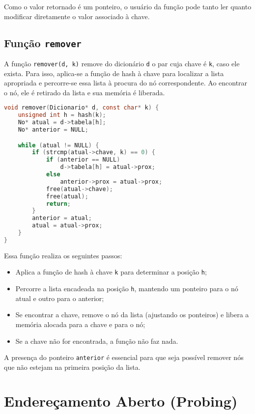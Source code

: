 Como o valor retornado é um ponteiro, o usuário da função pode tanto ler quanto modificar diretamente o valor associado à chave.

\subsection*{Função \texttt{remover}}

A função \texttt{remover(d, k)} remove do dicionário \texttt{d} o par cuja chave é \texttt{k}, caso ele exista. Para isso, aplica-se a função de hash à chave para localizar a lista apropriada e percorre-se essa lista à procura do nó correspondente. Ao encontrar o nó, ele é retirado da lista e sua memória é liberada.

\begin{lstlisting}[language=C, caption={Remoção de uma chave da tabela}]
void remover(Dicionario* d, const char* k) {
    unsigned int h = hash(k);
    No* atual = d->tabela[h];
    No* anterior = NULL;

    while (atual != NULL) {
        if (strcmp(atual->chave, k) == 0) {
            if (anterior == NULL)
                d->tabela[h] = atual->prox;
            else
                anterior->prox = atual->prox;
            free(atual->chave);
            free(atual);
            return;
        }
        anterior = atual;
        atual = atual->prox;
    }
}
\end{lstlisting}

Essa função realiza os seguintes passos:

\begin{itemize}
  \item Aplica a função de hash à chave \texttt{k} para determinar a posição \texttt{h};
  \item Percorre a lista encadeada na posição \texttt{h}, mantendo um ponteiro para o nó atual e outro para o anterior;
  \item Se encontrar a chave, remove o nó da lista (ajustando os ponteiros) e libera a memória alocada para a chave e para o nó;
  \item Se a chave não for encontrada, a função não faz nada.
\end{itemize}

A presença do ponteiro \texttt{anterior} é essencial para que seja possível remover nós que não estejam na primeira posição da lista.

\section{Endereçamento Aberto (Probing)}

